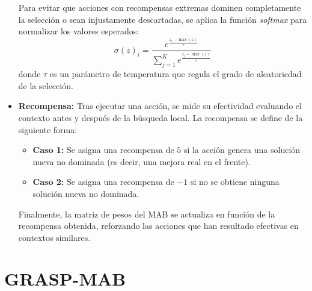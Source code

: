 \documentclass[12pt,a4paper]{book}
\begin{document}
\begin{itemize}
    Para evitar que acciones con recompensas extremas dominen completamente la selección o sean injustamente descartadas, se aplica la función \textit{softmax} para normalizar los valores esperados:
    \begin{equation}
        \sigma(z)_i = \frac{e^{\frac{z_i - \max(z)}{\tau}}}{\sum_{j=1}^{K} e^{\frac{z_j - \max(z)}{\tau}}}
    \end{equation}
    donde $\tau$ es un parámetro de temperatura que regula el grado de aleatoriedad de la selección.

    \item \textbf{Recompensa:} Tras ejecutar una acción, se mide su efectividad evaluando el contexto antes y después de la búsqueda local. La recompensa se define de la siguiente forma:
    \begin{itemize}
        \item \textbf{Caso 1:} Se asigna una recompensa de $5$ si la acción genera una solución nueva no dominada (es decir, una mejora real en el frente).
        \item \textbf{Caso 2:} Se asigna una recompensa de $-1$ si no se obtiene ninguna solución nueva no dominada.
    \end{itemize}

    Finalmente, la matriz de pesos del MAB se actualiza en función de la recompensa obtenida, reforzando las acciones que han resultado efectivas en contextos similares.
\end{itemize}

\newpage

\section{GRASP-MAB}
\end{document}
